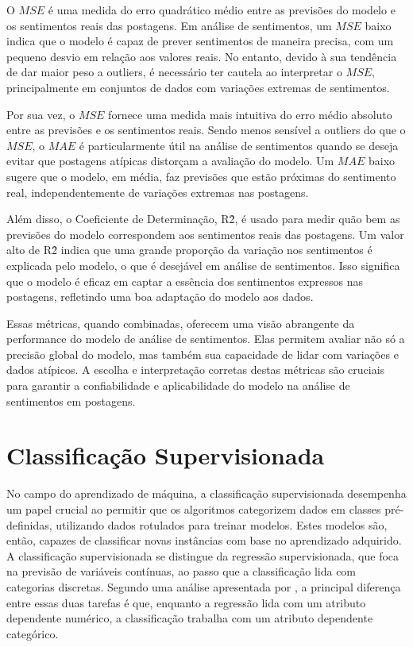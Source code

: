 O $MSE$ é uma medida do erro quadrático médio entre as previsões do modelo e os sentimentos reais das postagens. Em análise de sentimentos, um $MSE$ baixo indica que o modelo é capaz de prever sentimentos de maneira precisa, com um pequeno desvio em relação aos valores reais. No entanto, devido à sua tendência de dar maior peso a outliers, é necessário ter cautela ao interpretar o $MSE$, principalmente em conjuntos de dados com variações extremas de sentimentos.

Por sua vez, o $MSE$ fornece uma medida mais intuitiva do erro médio absoluto entre as previsões e os sentimentos reais. Sendo menos sensível a outliers do que o $MSE$, o $MAE$ é particularmente útil na análise de sentimentos quando se deseja evitar que postagens atípicas distorçam a avaliação do modelo. Um $MAE$ baixo sugere que o modelo, em média, faz previsões que estão próximas do sentimento real, independentemente de variações extremas nas postagens.

Além disso, o Coeficiente de Determinação, R\^2, é usado para medir quão bem as previsões do modelo correspondem aos sentimentos reais das postagens. Um valor alto de R\^2 indica que uma grande proporção da variação nos sentimentos é explicada pelo modelo, o que é desejável em análise de sentimentos. Isso significa que o modelo é eficaz em captar a essência dos sentimentos expressos nas postagens, refletindo uma boa adaptação do modelo aos dados.

Essas métricas, quando combinadas, oferecem uma visão abrangente da performance do modelo de análise de sentimentos. Elas permitem avaliar não só a precisão global do modelo, mas também sua capacidade de lidar com variações e dados atípicos. A escolha  e interpretação corretas destas métricas são cruciais para garantir a confiabilidade e aplicabilidade do modelo na análise de sentimentos em postagens.

\section{Classificação Supervisionada}

No campo do aprendizado de máquina, a classificação supervisionada desempenha um papel crucial ao permitir que os algoritmos categorizem dados em classes pré-definidas, utilizando dados rotulados para treinar modelos. Estes modelos são, então, capazes de classificar novas instâncias com base no aprendizado adquirido. A classificação supervisionada se distingue da regressão supervisionada, que foca na previsão de variáveis contínuas, ao passo que a classificação lida com categorias discretas. Segundo uma análise apresentada por , a principal diferença entre essas duas tarefas é que, enquanto a regressão lida com um atributo dependente numérico, a classificação trabalha com um atributo dependente categórico.

